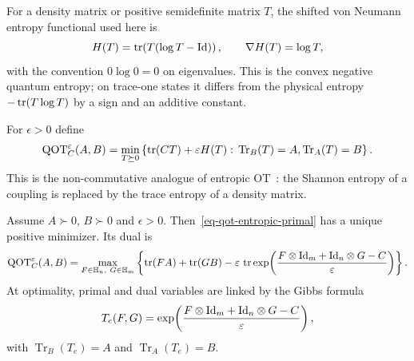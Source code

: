 \begin{defn}\label{def-von-neumann-quantum-entropy}
	For a density matrix or positive semidefinite matrix $T$, the shifted von Neumann entropy functional used here is
	\[
		H(T)=\operatorname{tr}\!\left(T(\log T-\mathrm{Id})\right),
		\qquad
		\nabla H(T)=\log T,
	\]
	with the convention $0\log0=0$ on eigenvalues. This is the convex negative quantum entropy; on trace-one states it differs from the physical entropy $-\operatorname{tr}(T\log T)$ by a sign and an additive constant.
\end{defn}
For $\epsilon>0$ define
\begin{equation}\label{eq-qot-entropic-primal}
	\mathrm{QOT}_C^\varepsilon(A,B)
	=
	\min_{T\succeq0}
	\left\{
		\operatorname{tr}(CT)+\varepsilon H(T)
		:\,
		\operatorname{Tr}_B(T)=A,
		\operatorname{Tr}_A(T)=B
	\right\}.
\end{equation}
This is the non-commutative analogue of entropic OT~\cite{2016-peyre-qot,chakrabarti2019quantum}: the Shannon entropy of a coupling is replaced by the trace entropy of a density matrix.

\begin{prop}\label{prop-qot-entropic-duality}
	Assume $A\succ0$, $B\succ0$ and $\epsilon>0$. Then~\eqref{eq-qot-entropic-primal} has a unique positive minimizer. Its dual is
	\begin{equation}\label{eq-qot-entropic-dual}
		\mathrm{QOT}_C^\varepsilon(A,B)
		=
		\max_{F\in\mathbb H_n,\ G\in\mathbb H_m}
		\left\{
			\operatorname{tr}(FA)+\operatorname{tr}(GB)
			-\varepsilon\,
			\operatorname{tr}\exp\!\left(\frac{F\otimes\mathrm{Id}_m+\mathrm{Id}_n\otimes G-C}{\varepsilon}\right)
		\right\}.
	\end{equation}
	At optimality, primal and dual variables are linked by the Gibbs formula
	\begin{equation}\label{eq-qot-gibbs-coupling}
		T_e(F,G)
		=
		\exp\!\left(\frac{F\otimes\mathrm{Id}_m+\mathrm{Id}_n\otimes G-C}{\varepsilon}\right),
	\end{equation}
	with $\operatorname{Tr}_B(T_e)=A$ and $\operatorname{Tr}_A(T_e)=B$.
\end{prop}

